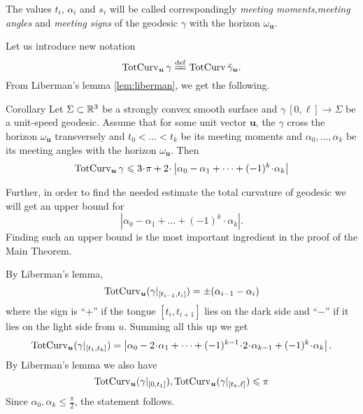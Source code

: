 \documentclass[a4paper,10pt]{amsart}
\begin{document}
The values $t_i$, $\alpha_i$ and $s_i$ 
will be called correspondingly \emph{meeting moments},\emph{meeting angles} and \emph{meeting signs}
of the geodesic $\gamma$ with the horizon $\omega_{\bm{u}}$.


Let us introduce new notation
\[\tc_{\bm{u}}\gamma\df\tc\tilde\gamma_{\bm{u}}.\]
From Liberman's lemma \ref{lem:liberman},
we get the following.

\begin{thm}{Corollary}\label{cor:liberman}
Let $\Sigma\subset\mathbb{R}^3$
be a strongly convex smooth surface
and $\gamma\:[0,\ell]\to \Sigma$ be a unit-speed geodesic.
Assume that for some unit vector $\bm{u}$,
the $\gamma$ cross the horizon $\omega_{\bm{u}}$ transversely
and 
$t_0<\dots <t_k$ be its meeting moments 
and $\alpha_0,\dots,\alpha_k$ be its meeting angles with the horizon $\omega_{\bm{u}}$.
Then
\[\tc_{\bm{u}}\gamma
\le 3\cdot\pi
+
2\cdot\left|\alpha_0-\alpha_1
+\dots +(-1)^k\cdot\alpha_k\right|
\]

\end{thm}

Further, in order to find the needed estimate the total curvature
of geodesic we will get an upper bound for
\[\left|\alpha_0-\alpha_1
+\dots +(-1)^k\cdot\alpha_k\right|.\]
Finding  such an upper bound is the most important ingredient in the proof of the Main Theorem.


By Liberman's lemma,
\[\mathop{\rm TotCurv}\nolimits_{\bm{u}}(\gamma|_{[t_{i-1},t_i]})=\pm(\alpha_{i-1}-\alpha_i)\]
where the sign is ``$+$'' 
if the tongue $[t_i,t_{i+1}]$ lies on the dark side 
and ``$-$'' if it lies on the light side from $u$.
Summing all this up we get
\[\tc_{\bm{u}}(\gamma|_{[t_1,t_{k}]})
=
\left|\alpha_0
-2\cdot\alpha_1
+\dots+(-1)^{k-1}\cdot2\cdot\alpha_{k-1}+(-1)^k\cdot\alpha_k\right|.\]
By Liberman's lemma we also have
\[\mathop{\rm TotCurv}\nolimits_{\bm{u}}(\gamma|_{[0,t_1]}),\mathop{\rm TotCurv}\nolimits_{\bm{u}}(\gamma|_{[t_k,\ell]})\leqslant \pi \]
Since $\alpha_0,\alpha_k\le\tfrac\pi2$, the statement follows.
\qeds 
\end{document}
